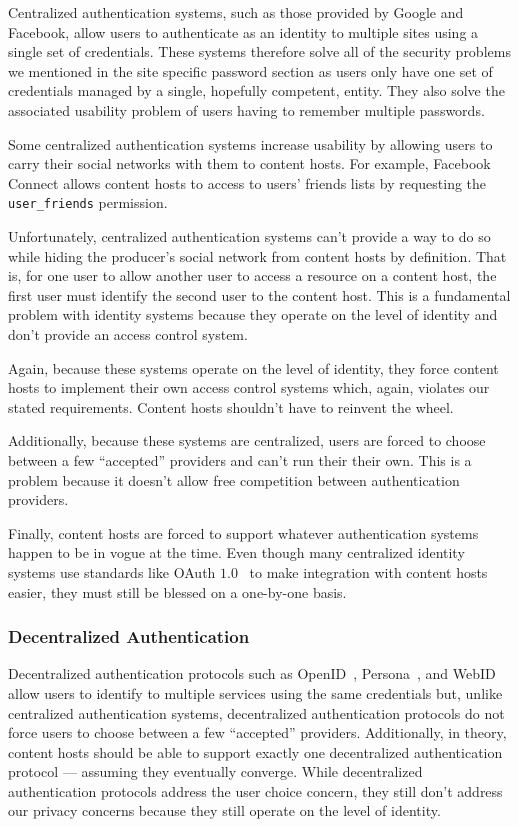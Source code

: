 \documentclass[pdftex,12pt,a4papaer,twoside,notitlepage]{report}
\begin{document}
Centralized authentication systems, such as those provided by Google and
Facebook, allow users to authenticate as an identity to multiple sites using a
single set of credentials. These systems therefore solve all of the security
problems we mentioned in the site specific password section as users only have
one set of credentials managed by a single, hopefully competent, entity. They
also solve the associated usability problem of users having to remember multiple
passwords.

Some centralized authentication systems increase usability by allowing users to
carry their social networks with them to content hosts. For example, Facebook
Connect allows content hosts to access to users' friends lists by requesting the
\verb=user_friends= permission\cite{facebook-connect-user-friends}.

Unfortunately, centralized authentication systems can't provide a way to do so
while hiding the producer's social network from content hosts by definition.
That is, for one user to allow another user to access a resource on a content
host, the first user must identify the second user to the content host. This is
a fundamental problem with identity systems because they operate on the level of
identity and don't provide an access control system.

Again, because these systems operate on the level of identity, they force
content hosts to implement their own access control systems which, again,
violates our stated requirements. Content hosts shouldn't have to reinvent the wheel.

Additionally, because these systems are centralized, users are forced to choose
between a few ``accepted'' providers and can't run their their own. This is a
problem because it doesn't allow free competition between authentication
providers.

Finally, content hosts are forced to support whatever authentication systems
happen to be in vogue at the time. Even though many centralized identity systems
use standards like OAuth $1.0$~\cite{oauth} to make integration with content
hosts easier, they must still be blessed on a one-by-one basis.

\subsubsection{Decentralized Authentication}

Decentralized authentication protocols such as OpenID~\cite{openid},
Persona~\cite{persona}, and WebID~\cite{webid} allow users to identify to
multiple services using the same credentials but, unlike centralized
authentication systems, decentralized authentication protocols do not force
users to choose between a few ``accepted'' providers. Additionally, in theory,
content hosts should be able to support exactly one decentralized authentication
protocol --- assuming they eventually converge. While decentralized
authentication protocols address the user choice concern, they still don't
address our privacy concerns because they still operate on the level of
identity.
\end{document}
